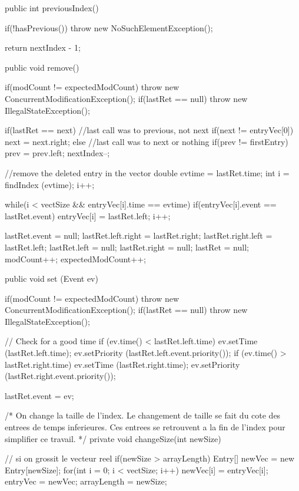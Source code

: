 \begin{code}
\begin{hide}
{{      public int previousIndex() {
         if(!hasPrevious())
            throw new NoSuchElementException();

         return nextIndex - 1;
      }


      public void remove() {
         if(modCount != expectedModCount)
            throw new ConcurrentModificationException();
         if(lastRet == null)
            throw new IllegalStateException();

         if(lastRet == next) { //last call was to previous, not next
            if(next != entryVec[0])
               next = next.right;
         } else { //last call was to next or nothing
            if(prev != firstEntry) {
               prev = prev.left;
               nextIndex--;
            }
         }

         //remove the deleted entry in the vector
         double evtime = lastRet.time;
         int i = findIndex (evtime);
         i++;

         while(i < vectSize && entryVec[i].time == evtime) {
            if(entryVec[i].event == lastRet.event)
               entryVec[i] = lastRet.left;
            i++;
         }

         lastRet.event = null;
         lastRet.left.right = lastRet.right;
         lastRet.right.left = lastRet.left;
         lastRet.left = null;
         lastRet.right = null;
         lastRet = null;
         modCount++;
         expectedModCount++;
      }

      public void set (Event ev) {
         if(modCount != expectedModCount)
            throw new ConcurrentModificationException();
         if(lastRet == null)
            throw new IllegalStateException();

         // Check for a good time
         if (ev.time() < lastRet.left.time) {
            ev.setTime (lastRet.left.time);
            ev.setPriority (lastRet.left.event.priority());
         }
         if (ev.time() > lastRet.right.time) {
            ev.setTime (lastRet.right.time);
            ev.setPriority (lastRet.right.event.priority());
         }

         lastRet.event = ev;
      }
   }

   /*
     On change la taille de l'index.
     Le changement de taille se fait du cote des entrees de temps inferieures.
     Ces entrees se retrouvent a la fin de l'index pour simplifier ce
     travail.
    */
   private void changeSize(int newSize) {
      // si on grossit le vecteur reel
      if(newSize > arrayLength) {
         Entry[] newVec = new Entry[newSize];
         for(int i = 0; i < vectSize; i++)
            newVec[i] = entryVec[i];
         entryVec = newVec;
         arrayLength = newSize;
      }

}}
\end{hide}
\end{code}
